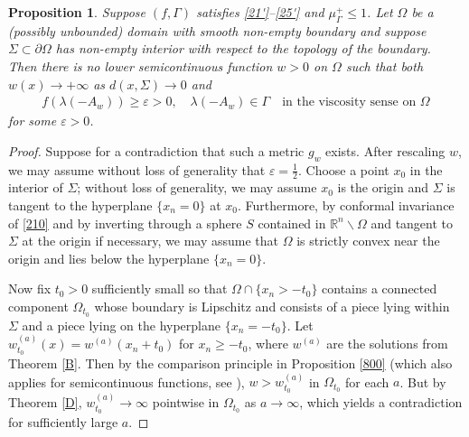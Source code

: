 \documentclass[12pt]{article}
\numberwithin{equation}{section}
\theoremstyle{plain}
\newtheorem{prop}[thm]{Proposition}
\theoremstyle{definition}
\newcommand{\ep}{\varepsilon}
\begin{document}
\begin{appendices}
\begin{prop}\label{505}
	Suppose $(f,\Gamma)$ satisfies \eqref{21'}--\eqref{25'} and $\mu_\Gamma^+ \leq 1$. Let $\Omega$ be a (possibly unbounded) domain with smooth non-empty boundary and suppose $\Sigma\subset\partial\Omega$ has non-empty interior with respect to the topology of the boundary. Then there is no lower semicontinuous function $w>0$ on $\Omega$ such that both $w(x)\rightarrow+\infty$ as $d(x,\Sigma)\rightarrow0$ and
	\begin{align}\label{210}
	f(\lambda(-A_w)) \geq \ep >0, \quad \lambda(-A_w)\in\Gamma \quad \text{in the viscosity sense on }\Omega
	\end{align}
	for some $\ep>0$. 
\end{prop}
\begin{proof}
	Suppose for a contradiction that such a metric $g_w$ exists. After rescaling $w$, we may assume without loss of generality that $\ep = \frac{1}{2}$. Choose a point $x_0$ in the interior of $\Sigma$; without loss of generality, we may assume $x_0$ is the origin and $\Sigma$ is tangent to the hyperplane $\{x_n=0\}$ at $x_0$. Furthermore, by conformal invariance of \eqref{210} and by inverting through a sphere $S$ contained in $\mathbb{R}^n\backslash\Omega$ and tangent to $\Sigma$ at the origin if necessary, we may assume that $\Omega$ is strictly convex near the origin and lies below the hyperplane $\{x_n=0\}$.\medskip 
	
	Now fix $t_0>0$ sufficiently small so that $\Omega\cap \{x_n>-t_0\}$ contains a connected component $\Omega_{t_0}$ whose boundary is Lipschitz and consists of a piece lying within $\Sigma$ and a piece lying on the hyperplane $\{x_n=-t_0\}$. Let $w_{t_0}^{(a)}(x) = w^{(a)}(x_n+t_0)$ for $x_n \geq -t_0$, where $w^{(a)}$ are the solutions from Theorem \ref{B}. Then by the comparison principle in Proposition \ref{800} (which also applies for semicontinuous functions, see \cite{LNW18}), $w > w^{(a)}_{t_0}$ in $\Omega_{t_0}$ for each $a$. But by Theorem \ref{D}, $w^{(a)}_{t_0}\rightarrow\infty$ pointwise in $\Omega_{t_0}$ as $a\rightarrow\infty$, which yields a contradiction for sufficiently large $a$.
\end{proof}




\end{appendices}


\footnotesize
{}

\end{document}
